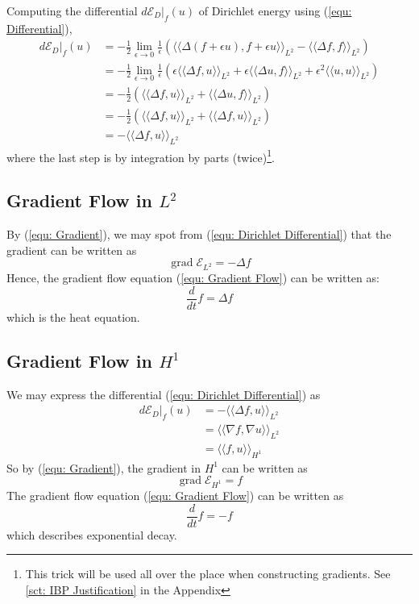 \documentclass[a4paper]{article}
\newcommand{\llangle}{\langle \langle}
\newcommand{\rrangle}{\rangle \rangle}
\theoremstyle{definition}
\DeclareMathOperator{\grad}{grad}
\begin{document}
Computing the differential $d \mathcal{E}_D|_f (u)$ of Dirichlet energy using (\ref{equ: Differential}),
\begin{align}
    d \mathcal{E}_D|_f(u) &= -\frac{1}{2} \lim_{\epsilon \rightarrow 0} \frac{1}{\epsilon} \left( \llangle \Delta (f+\epsilon u), f + \epsilon u \rrangle_{L^2} - \llangle \Delta f, f \rrangle_{L^2} \right) \\
    &= -\frac{1}{2} \lim_{\epsilon \rightarrow 0} \frac{1}{\epsilon} \left( \epsilon \llangle \Delta f, u \rrangle_{L^2} + \epsilon \llangle \Delta u, f \rrangle_{L^2} + \epsilon^2 \llangle u, u \rrangle_{L^2} \right) \\
    &= -\frac{1}{2} (\llangle \Delta f,u \rrangle_{L^2} + \llangle \Delta u, f \rrangle_{L^2}) \\
    &= -\frac{1}{2} (\llangle \Delta f,u \rrangle_{L^2} + \llangle \Delta f, u \rrangle_{L^2}) \\
    &= -\llangle \Delta f, u \rrangle_{L^2}
    \label{equ: Dirichlet Differential}
\end{align}
where the last step is by integration by parts (twice)\footnote{This trick will be used all over the place when constructing gradients. See \ref{sct: IBP Justification} in the Appendix}.

\subsection{Gradient Flow in $L^2$}
By (\ref{equ: Gradient}), we may spot from (\ref{equ: Dirichlet Differential}) that the gradient can be written as
\begin{equation}
    \grad \mathcal{E}_{L^2} = - \Delta f
    \label{equ: L2 Gradient}
\end{equation}
Hence, the gradient flow equation (\ref{equ: Gradient Flow}) can be written as:
\begin{equation}
    \frac{d}{dt} f = \Delta f
    \label{equ: L2 Gradient Flow}
\end{equation}
which is the heat equation.


\subsection{Gradient Flow in $H^1$}
We may express the differential (\ref{equ: Dirichlet Differential}) as
\begin{align}
    d \mathcal{E}_D|_f (u) &= - \llangle \Delta f, u \rrangle_{L^2} \\
    &= \llangle \nabla f, \nabla u \rrangle_{L^2} \\
    &= \llangle f, u \rrangle_{H^1}
    \label{equ: Gradient H1 Derivation}
\end{align}
So by (\ref{equ: Gradient}), the gradient in $H^1$ can be written as
\begin{equation}
    \grad \mathcal{E}_{H^1} = f
    \label{equ: H1 Gradient}
\end{equation}
The gradient flow equation (\ref{equ: Gradient Flow}) can be written as
\begin{equation}
    \frac{d}{dt}f = -f
    \label{equ: H1 Gradient Flow}
\end{equation}
which describes exponential decay.
\end{document}
